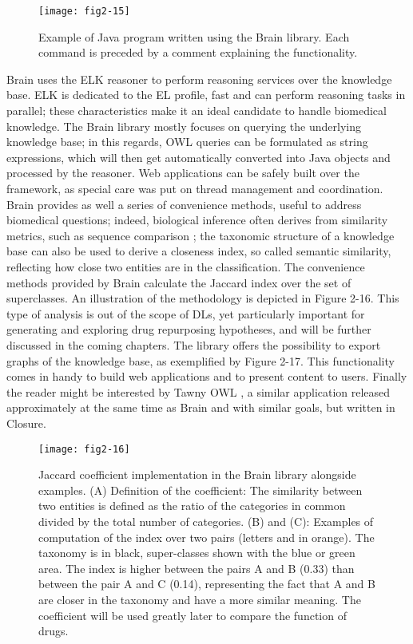 \begin{figure}[ht]
    \centering
    \texttt{[image: fig2-15]}
    \caption{Example of Java program written using the Brain library. Each command is preceded by a comment explaining the functionality.}
    \label{fig2-15}
\end{figure}

Brain uses the ELK reasoner \citep{kazakov2013incredible} to perform reasoning services over the knowledge base. ELK is dedicated to the EL profile, fast \citep{gonccalves2013owl} and can perform reasoning tasks in parallel; these characteristics make it an ideal candidate to handle biomedical knowledge. The Brain library mostly focuses on querying the underlying knowledge base; in this regards, OWL queries can be formulated as string expressions, which will then get automatically converted into Java objects and processed by the reasoner. Web applications can be safely built over the framework, as special care was put on thread management and coordination. Brain provides as well a series of convenience methods, useful to address biomedical questions; indeed, biological inference often derives from similarity metrics, such as sequence comparison \citep{stevens2007using}; the taxonomic structure of a knowledge base can also be used to derive a closeness index, so called semantic similarity, reflecting how close two entities are in the classification. The convenience methods provided by Brain calculate the Jaccard index over the set of superclasses. An illustration of the methodology is depicted in Figure 2-16. This type of analysis is out of the scope of DLs, yet particularly important for generating and exploring drug repurposing hypotheses, and will be further discussed in the coming chapters. The library offers the possibility to export graphs of the knowledge base, as exemplified by Figure 2-17. This functionality comes in handy to build web applications and to present content to users. Finally the reader might be interested by Tawny OWL \citep{lord2013semantic}, a similar application released approximately at the same time as Brain and with similar goals, but written in Closure.

\begin{figure}[ht]
    \centering
    \texttt{[image: fig2-16]}
    \caption{Jaccard coefficient implementation in the Brain library alongside examples. (A) Definition of the coefficient: The similarity between two entities is defined as the ratio of the categories in common divided by the total number of categories. (B) and (C): Examples of computation of the index over two pairs (letters and in orange). The taxonomy is in black, super-classes shown with the blue or green area. The index is higher between the pairs A and B (0.33) than between the pair A and C (0.14), representing the fact that A and B are closer in the taxonomy and have a more similar meaning.  The coefficient will be used greatly later to compare the function of drugs.}
    \label{fig2-16}
\end{figure}

